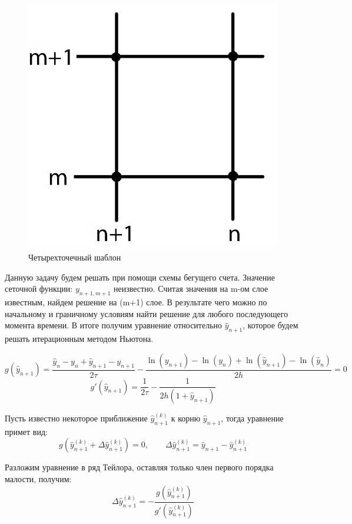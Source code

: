 \documentclass[a4paper,14pt]{article}
\begin{document}
\begin{figure}[h!]
\centering
\includegraphics[scale=0.4]{сетка.jpg}
\caption{\label{pic2}Четырехточечный шаблон}
\end{figure}

Данную задачу будем решать при помощи схемы бегущего счета. Значение сеточной функции: $y_{n+1,m+1}$ неизвестно. Считая значения на m-ом слое известным, найдем решение на (m+1) слое. В результате чего можно по начальному и граничному условиям найти решение для любого последующего момента времени. В итоге получим уравнение относительно $\hat{y}_{n+1}$, которое будем решать итерационным методом Ньютона.

$$g(\hat{y}_{n+1})=\frac{\hat{y}_n-y_n+\hat{y}_{n+1}-y_{n+1}}{2 \tau} - \frac{\ln(y_{n+1})-\ln(y_n)+\ln(\hat{y}_{n+1})-\ln(\hat{y}_n)}{2 h}=0$$
$$g'(\hat{y}_{n+1})=\frac{1}{2 \tau}-\frac{1}{2h(1+\hat{y}_{n+1})}$$

\noindent Пусть известно некоторое приближение $\hat{y}_{n+1}^{(k)}$ к корню $\hat{y}_{n+1}$, тогда уравнение примет вид:
$$g(\hat{y}_{n+1}^{(k)}+\Delta \hat{y}_{n+1}^{(k)})=0, \qquad \Delta \hat{y}_{n+1}^{(k)} = \hat{y}_{n+1} - \hat{y}_{n+1}^{(k)}$$

\noindent Разложим уравнение в ряд Тейлора, оставляя только член первого порядка малости, получим:
$$\Delta \hat{y}_{n+1}^{(k)} = - \frac{g(\hat{y}_{n+1}^{(k)})}{g'(\hat{y}_{n+1}^{(k)})}$$
\end{document}

